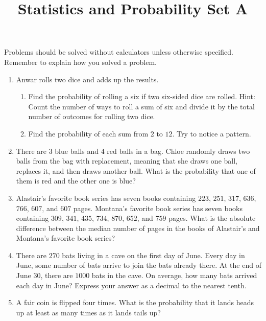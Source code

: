 \documentclass{article}
\title{Statistics and Probability Set A}
\date{}
\author{}
\begin{document}
    \maketitle
    \noindent Problems should be solved without calculators unless otherwise
    specified. Remember to explain how you solved a problem.
    \begin{enumerate}
        \item Anwar rolls two dice and adds up the results.
        \begin{enumerate}
            \item Find the probability of rolling a six if two six-sided dice
                are rolled. Hint: Count the number of ways to roll a sum of six
                and divide it by the total number of outcomes for rolling two
                dice.
                \vspace{3cm}
            \item Find the probability of each sum from $2$ to $12$. Try to
                notice a pattern.
                \vspace{3cm}
        \end{enumerate}
        \item There are $3$ blue balls and $4$ red balls in a bag. Chloe
            randomly draws two balls from the bag with replacement, meaning that
            she draws one ball, replaces it, and then draws another ball. What
            is the probability that one of them is red and the other one is
            blue?
            \vspace{3cm}
        \item Alastair's favorite book series has seven books containing $223$,
            $251$, $317$, $636$, $766$, $607$, and $607$ pages. Montana's
            favorite book series has seven books containing $309$, $341$, $435$,
            $734$, $870$, $652$, and $759$ pages. What is the absolute
            difference between the median number of pages in the books of
            Alastair's and Montana's favorite book series?
            \vspace{3cm}
        \item There are $270$ bats living in a cave on the first day of June.
            Every day in June, some number of bats arrive to join the bats
            already there. At the end of June 30, there are $1000$ bats in the
            cave. On average, how many bats arrived each day in June? Express
            your answer as a decimal to the nearest tenth.
            \vspace{3cm}
        \item A fair coin is flipped four times. What is the probability that it
            lands heads up at least as many times as it lands tails up?
    \end{enumerate}
\end{document}

